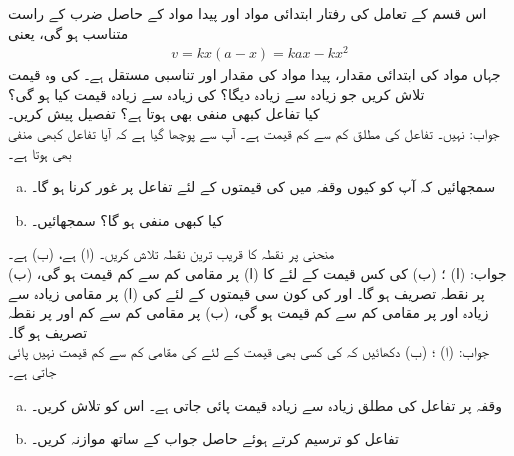 اس قسم کے تعامل کی رفتار  ابتدائی مواد اور پیدا مواد کے حاصل ضرب کے راست متناسب ہو گی، یعنی
\begin{align*}
v=kx(a-x)=kax-kx^2
\end{align*} 
جہاں  مواد کی ابتدائی مقدار،  پیدا مواد کی مقدار اور  تناسبی مستقل ہے۔ کی وہ قیمت تلاش کریں جو زیادہ سے زیادہ   دیگا؟  کی زیادہ سے زیادہ قیمت کیا ہو گی؟
\\
کیا تفاعل  کبھی منفی بھی ہوتا ہے؟ تفصیل پیش کریں۔\\
جواب:\quad
نہیں۔ تفاعل کی مطلق کم سے کم قیمت  ہے۔ 
آپ سے پوچھا گیا ہے کہ آیا تفاعل  کبھی منفی بھی ہوتا ہے۔
\begin{enumerate}[a.]
\item
سمجھائیں کہ آپ کو  کیوں وقفہ  میں  کی قیمتوں کے لئے تفاعل پر غور کرنا ہو گا۔
\item
کیا  کبھی منفی ہو گا؟ سمجھائیں۔
\end{enumerate}
منحنی  پر نقطہ  کا قریب ترین نقطہ تلاش کریں۔ (ا)  ہے، (ب)  ہے۔\\
جواب:\quad
(ا) ؛ (ب) 
 کی کس قیمت کے لئے  کا (ا)  پر مقامی کم سے کم قیمت ہو گی، (ب)  پر نقطہ تصریف ہو گا۔
 اور  کی کون سی قیمتوں کے لئے  کی (ا)  پر مقامی زیادہ سے زیادہ اور  پر مقامی کم سے کم قیمت ہو گی، (ب)  پر مقامی کم سے کم اور  پر نقطہ تصریف ہو گا۔\\
جواب:\quad
(ا) ؛ (ب) 
دکھائیں کہ  کی کسی بھی قیمت کے لئے  کی مقامی کم سے کم قیمت نہیں پائی جاتی ہے۔
\begin{enumerate}[a.]
\item
وقفہ  پر تفاعل  کی مطلق زیادہ سے زیادہ قیمت پائی جاتی ہے۔ اس کو تلاش کریں۔
\item
تفاعل کو ترسیم کرتے ہوئے حاصل جواب کے ساتھ موازنہ کریں۔
\end{enumerate}
